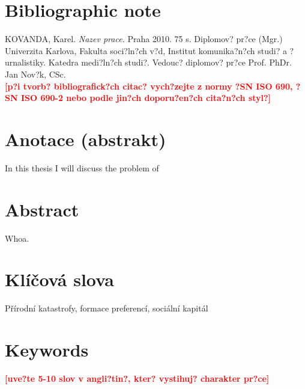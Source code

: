 \pagestyle{empty}

\section*{Bibliographic note}

\noindent KOVANDA, Karel. \textit{Nazev prace.} Praha 2010. 75 s.
Diplomov? pr?ce (Mgr.) Univerzita Karlova, Fakulta soci?ln?ch v?d,
Institut komunika?n?ch studi? a ?urnalistiky. Katedra medi?ln?ch
studi?. Vedouc? diplomov? pr?ce Prof. PhDr. Jan Nov?k, CSc. \\
\textbf{\textcolor{red}{[p?i tvorb? bibliografick?ch citac?
vych?zejte z normy ?SN ISO 690, ?SN ISO 690-2 nebo podle jin?ch
doporu?en?ch cita?n?ch styl?]}}\\

\section*{Anotace (abstrakt)}
In this thesis I will discuss the problem of\\


\section*{Abstract}
Whoa. \\


\section*{Klíčová slova}
Přírodní katastrofy, formace preferencí, sociální kapitál\\

\section*{Keywords}
\textbf{\textcolor{red}{[uve?te 5-10 slov v angli?tin?, kter? vystihuj? charakter pr?ce]}}\\

\newpage
